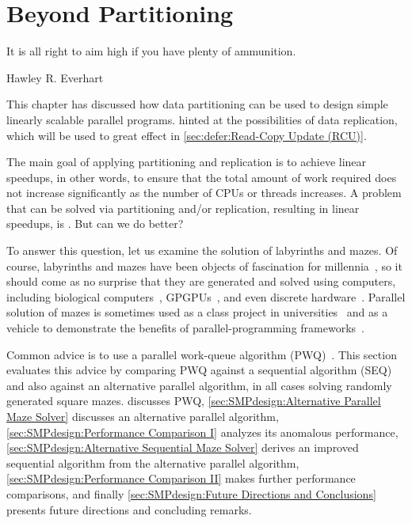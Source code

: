 
\section{Beyond Partitioning}
\label{sec:SMPdesign:Beyond Partitioning}
%
\epigraph{It is all right to aim high if you have plenty of ammunition.}
	 {Hawley R. Everhart}

This chapter has discussed how data partitioning can be used to design
simple linearly scalable parallel programs.
 hinted at the possibilities
of data replication, which will be used to great effect in
\cref{sec:defer:Read-Copy Update (RCU)}.

The main goal of applying partitioning and replication is to achieve
linear speedups, in other words, to ensure that the total amount of
work required does not increase significantly as the number of CPUs
or threads increases.
A problem that can be solved via partitioning and/or replication,
resulting in linear speedups, is \emph{}.
But can we do better?

To answer this question, let us examine the solution of
labyrinths and mazes.
Of course, labyrinths and mazes have been objects of fascination for
millennia~\cite{WikipediaLabyrinth},
so it should come as no surprise that they are generated and solved
using computers, including biological
computers~\cite{AndrewAdamatzky2011SlimeMold},
GPGPUs~\cite{ChristerEricson2008GPUMaze}, and even
discrete hardware~\cite{MIT:TRMag:MemristorMazes}.
Parallel solution of mazes is sometimes used as a class project in
universities~\cite{ETHZurich:FS2011maze,UMD:CMSC433maze} and
as a vehicle to demonstrate the benefits of parallel-programming
frameworks~\cite{RonFosner2010maze}.

Common advice is to use a parallel work-queue algorithm
(PWQ)~\cite{ETHZurich:FS2011maze,RonFosner2010maze}.
This section evaluates this advice by comparing PWQ
against a sequential algorithm (SEQ) and also against
an alternative parallel algorithm, in all cases solving randomly generated
square mazes.
 discusses PWQ,
\cref{sec:SMPdesign:Alternative Parallel Maze Solver} discusses an alternative
parallel algorithm,
\cref{sec:SMPdesign:Performance Comparison I} analyzes its anomalous performance,
\cref{sec:SMPdesign:Alternative Sequential Maze Solver} derives an improved
sequential algorithm from the alternative parallel algorithm,
\cref{sec:SMPdesign:Performance Comparison II} makes further performance
comparisons,
and finally
\cref{sec:SMPdesign:Future Directions and Conclusions}
presents future directions and concluding remarks.

